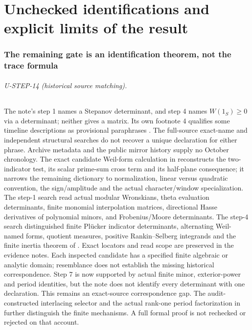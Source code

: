 \part{Unchecked identifications and explicit limits of the result}
\section{The remaining gate is an identification theorem, not the trace formula}
\paragraph{U-STEP-14 (historical source matching).}
The note's step 1 names a Stepanov determinant, and step 4 names $W(1_S)\ge0$ via a determinant; neither gives a matrix. Its own footnote 4 qualifies some timeline descriptions as provisional paraphrases \cite[p.~3, footnote 4]{alpoge}. The full-source exact-name and independent structural searches do not recover a unique declaration for either phrase. Archive metadata and the public mirror history supply no October chronology. The exact candidate Weil-form calculation in  reconstructs the two-indicator test, its scalar prime-sum cross term and its half-plane consequence; it narrows the remaining dictionary to normalization, linear versus quadratic convention, the sign/amplitude and the actual character/window specialization. The step-1 search read actual modular Wronskians, theta evaluation determinants, finite monomial interpolation matrices, directional Hasse derivatives of polynomial minors, and Frobenius/Moore determinants. The step-4 search distinguished finite Pl\"ucker indicator determinants, alternating Weil-named forms, quotient measures, positive Rankin--Selberg integrands and the finite inertia theorem of . Exact locators and read scope are preserved in the evidence notes. Each inspected candidate has a specified finite algebraic or analytic domain; resemblance does not establish the missing historical correspondence. Step 7 is now supported by actual finite minor, exterior-power and period identities, but the note does not identify every determinant with one declaration. This remains an exact-source correspondence gap. The audit-constructed interlacing selector and the actual rank-one period factorization in  further distinguish the finite mechanisms. A full formal proof is not rechecked or rejected on that account.

